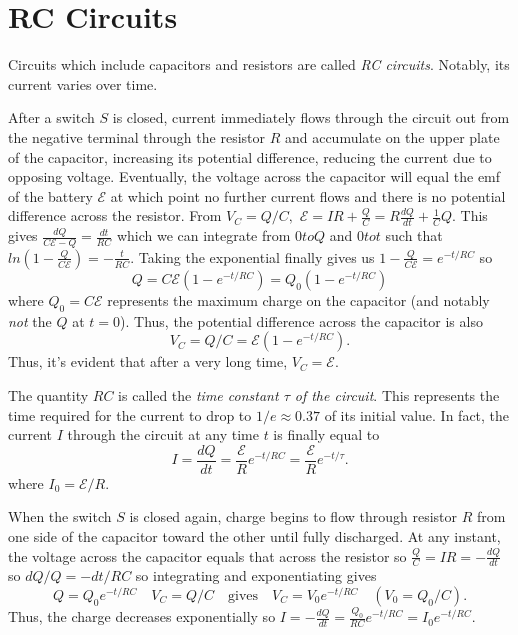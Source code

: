 \section{RC Circuits}

\begin{definition}[RC Circuits]
    Circuits which include capacitors and resistors are called \emph{RC circuits}. Notably, its current varies over time. 
\end{definition}
\begin{remark}
    After a switch $S$ is closed, current immediately flows through the circuit out from the negative terminal through the resistor $R$ and accumulate on the upper plate of the capacitor, increasing its potential difference, reducing the current due to opposing voltage. Eventually, the voltage across the capacitor will equal the emf of the battery $\mathscr{E}$ at which point no further current flows and there is no potential difference across the resistor. From $V_C = Q/C,$ $\mathscr{E} = IR + \frac{Q}{C} = R\frac{dQ}{dt} + \frac{1}{C}Q$. This gives $\frac{dQ}{C\mathscr{E} - Q} = \frac{dt}{RC}$ which we can integrate from $0 to Q$ and $0 to t$ such that $ln(1 - \frac{Q}{C\mathscr{E}}) = -\frac{t}{RC}$. Taking the exponential finally gives us $1 - \frac{Q}{C\mathscr{E}} = e^{-t/RC}$ so $$Q = C\mathscr{E}(1-e^{-t/RC}) = Q_0(1-e^{-t/RC})$$ where $Q_0 = C\mathscr{E}$ represents the maximum charge on the capacitor (and notably \emph{not} the $Q$ at $t=0$). Thus, the potential difference across the capacitor is also $$V_C = Q/C = \mathscr{E}(1-e^{-t/RC}).$$ Thus, it's evident that after a very long time, $V_C = \mathscr{E}.$

    The quantity $RC$ is called the \emph{time constant $\tau$ of the circuit}. This represents the time required for the current to drop to $1/e \approx 0.37$ of its initial value. In fact, the current $I$ through the circuit at any time $t$ is finally equal to $$I = \frac{dQ}{dt} = \frac{\mathscr{E}}{R}e^{-t/RC} = \frac{\mathscr{E}}{R}e^{-t/\tau}.$$ where $I_0 = \mathscr{E}/R.$
\end{remark}
\begin{remark}
    When the switch $S$ is closed again, charge begins to flow through resistor $R$ from one side of the capacitor toward the other until fully discharged. At any instant, the voltage across the capacitor equals that across the resistor so $\frac{Q}{C} = IR = -\frac{dQ}{dt}$ so $dQ/Q = -dt/RC$ so integrating and exponentiating gives $$Q = Q_0e^{-t/RC} \quad V_C = Q/C \quad\text{gives} \quad V_C = V_0e^{-t/RC} \quad (V_0 = Q_0/C).$$ Thus, the charge decreases exponentially so $I = -\frac{dQ}{dt} = \frac{Q_0}{RC}e^{-t/RC} = I_0e^{-t/RC}.$
\end{remark}
